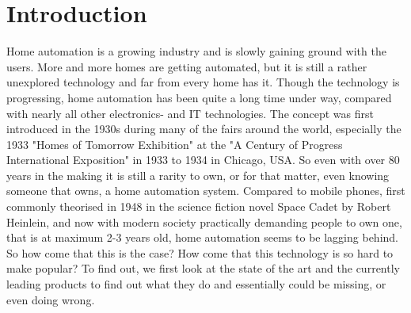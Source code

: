 \chapter{Introduction}\label{part:introduction}

Home automation is a growing industry and is slowly gaining ground with the users. More and more homes are getting automated, but it is still a rather unexplored technology and far from every home has it. Though the technology is progressing, home automation has been quite a long time under way, compared with nearly all other electronics- and IT technologies. The concept was first introduced in the 1930s during many of the fairs around the world, especially the 1933 "Homes of Tomorrow Exhibition" at the "A Century of Progress International Exposition" in 1933 to 1934 in Chicago, USA. So even with over 80 years in the making it is still a rarity to own, or for that matter, even knowing someone that owns, a home automation system. Compared to mobile phones, first commonly theorised in 1948 in the science fiction novel Space Cadet by Robert Heinlein, and now with modern society practically demanding people to own one, that is at maximum 2-3 years old, home automation seems to be lagging behind. So how come that this is the case? How come that this technology is so hard to make popular? To find out, we first look at the state of the art and the currently leading products to find out what they do and essentially could be missing, or even doing wrong.

